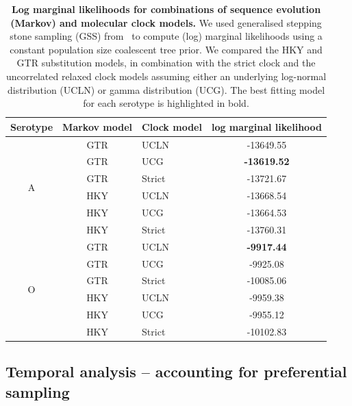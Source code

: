 \documentclass[a4paper,10pt]{article}
\begin{document}
\begin{table}[!ht]
\caption{\textbf{Log marginal likelihoods for combinations of sequence evolution (Markov) and molecular clock models.}
We used generalised stepping stone sampling (GSS) from~\citep{M-Baele2016} to compute (log) marginal likelihoods using a constant population size coalescent tree prior.
We compared the HKY and GTR substitution models, in combination with the strict clock and the uncorrelated relaxed clock models assuming either an underlying log-normal distribution (UCLN) or gamma distribution (UCG).
The best fitting model for each serotype is highlighted in bold.
}
\begin{center}
 \begin{tabular}{cclc}
\hline
Serotype & Markov model & Clock model & log marginal likelihood \\
\hline
\multirow{6}{*}{A} & GTR & UCLN & -13649.55 \\
 & GTR & UCG & \textbf{-13619.52} \\
 & GTR & Strict & -13721.67 \\
 & HKY & UCLN & -13668.54 \\
 & HKY & UCG & -13664.53 \\
 & HKY & Strict & -13760.31 \\
 \hline
\multirow{6}{*}{O}& GTR & \multicolumn{1}{l}{UCLN} & \textbf{-9917.44} \\
\multicolumn{1}{l}{} & GTR & \multicolumn{1}{l}{UCG} & -9925.08 \\
\multicolumn{1}{l}{} & GTR & \multicolumn{1}{l}{Strict} & -10085.06 \\
\multicolumn{1}{l}{} & HKY & \multicolumn{1}{l}{UCLN} & -9959.38 \\
\multicolumn{1}{l}{} & HKY & \multicolumn{1}{l}{UCG} & -9955.12 \\
\multicolumn{1}{l}{} & HKY & \multicolumn{1}{l}{Strict} & -10102.83\\
\hline
\end{tabular}
\end{center}
\label{stab:treeclockselection}
\end{table}
\newpage

\subsection*{Temporal analysis -- accounting for preferential sampling}
\end{document}
